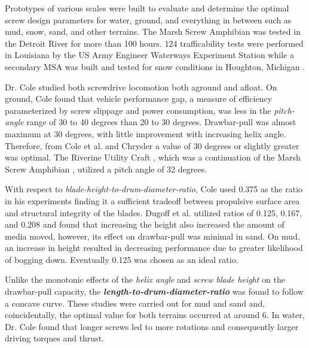 

Prototypes of various scales were built to evaluate and determine the optimal screw design parameters for water, ground, and  everything in between such as mud, snow, sand, and other terrains. The Marsh Screw Amphibian was tested in the Detroit River for more than 100 hours. 124 trafficability tests were performed in Louisiana by the US Army Engineer Waterways Experiment Station while a secondary MSA was built and tested for snow conditions in Houghton, Michigan \cite{Gorton1965}. 

Dr. Cole studied both screwdrive locomotion both aground and afloat. On ground, Cole \cite{Cole1961} found that vehicle performance gap, a measure of efficiency parameterized by screw slippage and power consumption, was less in the \emph{pitch-angle} range of 30 to 40 degrees than 20 to 30 degrees.  Drawbar-pull was almost maximum at 30 degrees, with little improvement with increasing helix angle. Therefore, from Cole et al. \cite{Cole1961} and Chrysler \cite{Dugoff1967, Fales1972} a value of 30 degrees or slightly greater was optimal. The Riverine Utility Craft \cite{Fales1972}, which was a continuation of the Marsh Screw Amphibian \cite{Dugoff1967}, utilized a pitch angle of 32 degrees.

With respect to \emph{blade-height-to-drum-diameter-ratio}, Cole used 0.375 as the ratio in his experiments finding it a sufficient tradeoff between propulsive surface area and structural integrity of the blades. Dugoff et al. \cite{Dugoff1967} utilized ratios of 0.125, 0.167, and 0.208 and found that increasing the height also increased the amount of media moved, however, its effect on drawbar-pull was minimal in sand. On mud, an increase in height resulted in decreasing performance due to greater likelihood of bogging down. Eventually 0.125 was chosen as an ideal ratio.


Unlike the monotonic effects of the \emph{helix angle} and \emph{screw blade height} on the drawbar-pull capacity, the \textbf{\emph{length-to-drum-diameter-ratio}} was found to follow a concave curve. These studies were carried out for mud and sand and, coincidentally, the optimal value for both terrains occurred at around 6. In water, Dr. Cole found that longer screws led to more rotations and consequently larger driving torques and thrust.  

